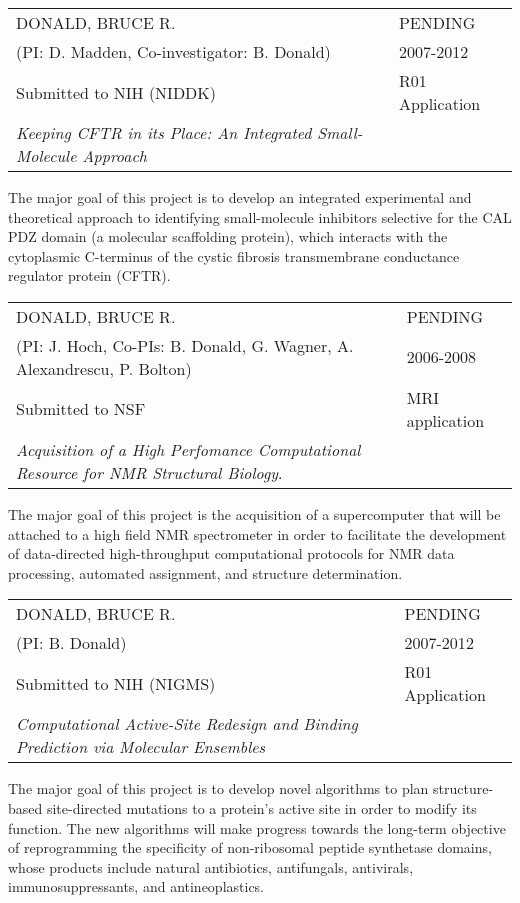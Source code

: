 \documentclass[11pt]{nih}
\begin{document}
\myhrule 
\noindent \begin{tabular}{ll} DONALD, BRUCE R.& PENDING \\
 (PI: D. Madden, Co-investigator: B. Donald) & 2007-2012\\
Submitted to NIH (NIDDK) & R01 Application \\
 {\em Keeping CFTR in its
Place: An Integrated Small-Molecule Approach}\\
\end{tabular}

The major goal of this project is to develop an integrated
experimental and theoretical approach to identifying small-molecule
inhibitors selective for the CAL PDZ domain (a molecular scaffolding
protein), which interacts with the cytoplasmic C-terminus of the
cystic fibrosis transmembrane conductance regulator protein (CFTR).
 

\myhrule 
\noindent \begin{tabular}{ll} DONALD, BRUCE R.& PENDING \\
 (PI: J. Hoch, Co-PIs: B. Donald, G. Wagner, A. Alexandrescu,
 P. Bolton) & 2006-2008\\ 
Submitted to NSF & MRI application \\
{\em	Acquisition of a High Perfomance Computational
Resource for NMR Structural Biology}.&\\
\end{tabular}

The major goal of this project is the acquisition of a supercomputer
that will be attached to a high field NMR spectrometer in order to
facilitate the development of data-directed high-throughput
computational protocols for NMR data processing, automated assignment,
and structure determination.

\myhrule 

\noindent \begin{tabular}{ll} DONALD, BRUCE R.& PENDING \\
 (PI: B. Donald) & 2007-2012\\
Submitted to NIH (NIGMS) & R01 Application \\
 {\em Computational Active-Site Redesign and Binding Prediction via Molecular Ensembles}\\
\end{tabular}

The major goal of this project is to develop novel algorithms to plan
structure-based site-directed mutations to a protein's active site in
order to modify its function.  The new algorithms will make progress
towards the long-term objective of reprogramming the specificity of
non-ribosomal peptide synthetase domains, whose products include
natural antibiotics, antifungals, antivirals, immunosuppressants, and
antineoplastics.


\myhrule 

 
\end{document}
